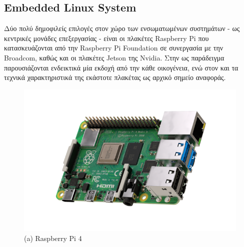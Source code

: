 
\subsection{Embedded Linux System}
Δύο πολύ δημοφιλείς επιλογές στον χώρο των ενσωματωμένων συστημάτων - ως κεντρικές μονάδες επεξεργασίας - είναι οι πλακέτες Raspberry Pi που κατασκευάζονται από την Raspberry Pi Foundation σε συνεργασία με την Broadcom, καθώς και οι πλακέτες Jetson της Nvidia. Στην  ως παράδειγμα παρουσιάζονται ενδεικτικά μία εκδοχή από την κάθε οικογένεια, ενώ στον  και  τα τεχνικά χαρακτηριστικά της εκάστοτε πλακέτας ως αρχικό σημείο αναφοράς. 

\begin{figure} [H]
	\centering
    \begin{minipage}{.5\textwidth}
      \centering
      \includegraphics[width=\linewidth]{../Images/Design-Implementation/raspberry-pi-4.png}\\
      {(a) Raspberry Pi 4 }
    \end{minipage}%
    \begin{minipage}{.5\textwidth}
      \centering

\end{minipage}
\end{figure}

